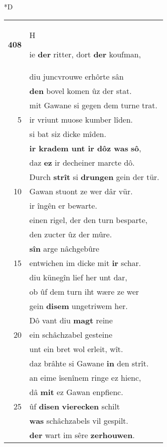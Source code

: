 \documentclass[8pt,a4paper,notitlepage]{article}
\begin{document}
\begin{table}[ht]
\begin{minipage}[t]{0.5\linewidth}
\small
\begin{center}*D
\end{center}
\begin{tabular}{rl}
\textbf{408} & \begin{large}H\end{large}ie \textbf{der} ritter, dort \textbf{der} koufman,\\ 
 & diu juncvrouwe erhôrte sân\\ 
 & \textbf{den} bovel komen ûz der stat.\\ 
 & mit Gawane si gegen dem turne trat.\\ 
5 & ir vriunt muose kumber lîden.\\ 
 & si bat siz dicke mîden.\\ 
 & \textbf{ir kradem unt ir dôz was} \textbf{sô},\\ 
 & daz \textbf{ez} ir decheiner marcte dô.\\ 
 & Durch \textbf{strît} si \textbf{drungen} gein der tür.\\ 
10 & Gawan stuont ze wer dâr vür.\\ 
 & ir îngên er bewarte.\\ 
 & einen rigel, der den turn besparte,\\ 
 & den zucter ûz der mûre.\\ 
 & \textbf{sîn} arge nâchgebûre\\ 
15 & entwichen im dicke mit \textbf{ir} schar.\\ 
 & diu künegîn lief her unt dar,\\ 
 & ob ûf dem turn iht wære ze wer\\ 
 & gein \textbf{disem} ungetriwem her.\\ 
 & Dô vant diu \textbf{magt} reine\\ 
20 & ein schâchzabel gesteine\\ 
 & unt ein bret wol erleit, wît.\\ 
 & daz brâhte si Gawane \textbf{in} den strît.\\ 
 & an eime îsenînem ringe ez hienc,\\ 
 & dâ \textbf{mit} ez Gawan enpfienc.\\ 
25 & ûf \textbf{disen} \textbf{vierecken} schilt\\ 
 & \textbf{was} schâchzabels vil gespilt.\\ 
 & \textbf{der} wart im sêre \textbf{zerhouwen}.\\ 

\end{tabular}
\end{minipage}
\end{table}
\end{document}
